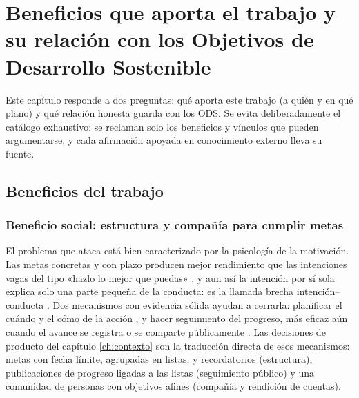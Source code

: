 
\chapter{Beneficios que aporta el trabajo y su relación con los Objetivos
  de Desarrollo Sostenible}
\label{ch:beneficios}

Este capítulo responde a dos preguntas: qué aporta este trabajo (a quién y en qué plano) y qué relación honesta guarda con los \ac{ODS}.
Se evita deliberadamente el catálogo exhaustivo: se reclaman solo los beneficios y vínculos que pueden argumentarse, y cada afirmación apoyada en conocimiento externo lleva su fuente.

\section{Beneficios del trabajo}
\label{sec:beneficios}

\subsection{Beneficio social: estructura y compañía para cumplir metas}
\label{sec:beneficios-social}

El problema que \bukit ataca está bien caracterizado por la psicología de la motivación.
Las metas concretas y con plazo producen mejor rendimiento que las intenciones vagas del tipo «hazlo lo mejor que puedas» \parencite{locke-latham-goals}, y aun así la intención por sí sola explica solo una parte pequeña de la conducta: es la llamada brecha intención--conducta \parencite{sheeran-intention}.
Dos mecanismos con evidencia sólida ayudan a cerrarla: planificar el cuándo y el cómo de la acción \parencite{gollwitzer-implementation}, y hacer seguimiento del progreso, más eficaz aún cuando el avance se registra o se comparte públicamente \parencite{harkin-monitoring}.
Las decisiones de producto del capítulo \ref{ch:contexto} son la traducción directa de esos mecanismos: metas con fecha límite, agrupadas en listas, y recordatorios (estructura), publicaciones de progreso ligadas a las listas (seguimiento público) y una comunidad de personas con objetivos afines (compañía y rendición de cuentas).

